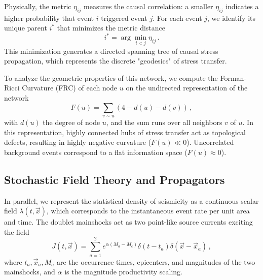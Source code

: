 \documentclass[twocolumn,amsmath,amssymb,aps,pre,superscriptaddress]{revtex4-1}
\begin{document}
Physically, the metric $\eta_{ij}$ measures the causal correlation: a smaller $\eta_{ij}$ indicates a higher probability that event $i$ triggered event $j$. For each event $j$, we identify its unique parent $i^*$ that minimizes the metric distance
\begin{equation}
i^* = \arg\min_{i < j} \eta_{ij} \,.
\end{equation}
This minimization generates a directed spanning tree of causal stress propagation, which represents the discrete "geodesics" of stress transfer. 

To analyze the geometric properties of this network, we compute the Forman-Ricci Curvature (FRC) of each node $u$ on the undirected representation of the network \cite{Sreejith2016, ollivier2009ricci}
\begin{equation}
F(u) = \sum_{v \sim u} (4 - d(u) - d(v)) \,,
\label{eq:frc}
\end{equation}
with $d(u)$ the degree of node $u$, and the sum runs over all neighbors $v$ of $u$. In this representation, highly connected hubs of stress transfer act as topological defects, resulting in highly negative curvature ($F(u) \ll 0$). Uncorrelated background events correspond to a flat information space ($F(u) \approx 0$).

\subsection{Stochastic Field Theory and Propagators}
\label{sec:field}
In parallel, we represent the statistical density of seismicity as a continuous scalar field $\lambda(t, \vec{x})$, which corresponds to the instantaneous event rate per unit area and time. The doublet mainshocks act as two point-like source currents exciting the field
\begin{equation}
J(t, \vec{x}) = \sum_{a=1}^2 e^{\alpha(M_a - M_c)} \delta(t - t_a) \delta(\vec{x} - \vec{x}_a)\,,
\label{eq:current}
\end{equation}
where $t_a, \vec{x}_a, M_a$ are the occurrence times, epicenters, and magnitudes of the two mainshocks, and $\alpha$ is the magnitude productivity scaling. 
\end{document}
